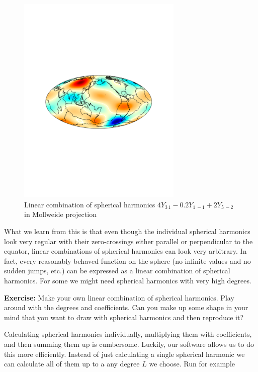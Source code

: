 \documentclass[11pt]{article}
\newcommand{\Yfun}{Y}
\begin{document}
\begin{figure}%
  \centering
  \includegraphics[width=0.7\textwidth,trim = 3cm 9cm 3cm 10cm, clip]{figures/mixY}
  \caption{Linear combination of spherical harmonics $4\Yfun_{3\,1} - 0.2\Yfun_{1\,-1} +2\Yfun_{5\,-2}$ in Mollweide projection}
  \label{MixY}
\end{figure}

What we learn from this is that even though the individual spherical
harmonics look very regular with their zero-crossings either parallel
or perpendicular to the equator, linear combinations of spherical
harmonics can look very arbitrary. In fact, every reasonably behaved
function on the sphere (no infinite values and no sudden jumps, etc.)
can be expressed as a linear combination of spherical harmonics. For
some we might need spherical harmonics with very high degrees.

\textbf{Exercise:} Make your own linear combination of spherical
harmonics. Play around with the degrees and coefficients. Can you make
up some shape in your mind that you want to draw with spherical
harmonics and then reproduce it?

Calculating spherical harmonics individually, multiplying them with
coefficients, and then summing them up is cumbersome. Luckily, our
software allows us to do this more efficiently. Instead of just
calculating a single spherical harmonic we can calculate all of them
up to a any degree $L$ we choose. Run for example
\end{document}
